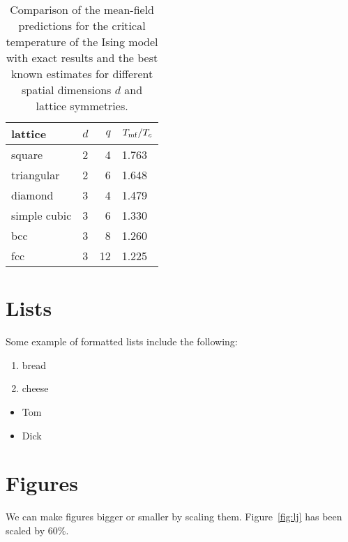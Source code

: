 \documentclass[12pt]{article}
\begin{document}
\begin{table}[h]
  \begin{center}
    \begin{tabular}{|l|l|r|l|}
      \hline
      lattice & $d$ & $q$ & $T_{\rm mf}/T_c$ \\
      \hline
      square & 2 & 4 & 1.763 \\
      \hline
      triangular & 2 & 6 & 1.648 \\
      \hline
      diamond & 3 & 4 & 1.479 \\
      \hline
      simple cubic & 3 & 6 & 1.330 \\
      \hline
      bcc & 3 & 8 & 1.260 \\
      \hline
      fcc & 3 & 12 & 1.225 \\
      \hline
    \end{tabular}
    \caption{\label{tab:5/tc}Comparison of the mean-field predictions
      for the critical temperature of the Ising model with exact results
      and the best known estimates for different spatial dimensions $d$
    and lattice symmetries.}
  \end{center}
\end{table}

\section{Lists}

Some example of formatted lists include the
following:

\begin{enumerate}

  \item bread

  \item cheese

\end{enumerate}

\begin{itemize}

  \item Tom

  \item Dick

\end{itemize}

\section{Figures}

We can make figures bigger or smaller by scaling them. Figure~\ref{fig:lj}
has been scaled by 60\%.
\end{document}
